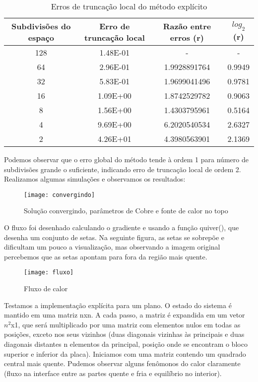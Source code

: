 \documentclass[12pt,fleqn]{article}
\begin{document}
\begin{table}[htb]
\begin{center}
		\begin{tabular}{|c|c|c|c|}\hline
			Subdivisões do espaço & Erro de truncação local & Razão entre erros (r) & $log_2$(r) \\\hline
			128 & 1.48E-01 & - & - \\\hline
			64 & 2.96E-01 & 1.9928891764 & 0.9949 \\\hline
			32 & 5.83E-01 & 1.9699041496 & 0.9781 \\\hline
			16 & 1.09E+00 & 1.8742529782 & 0.9063 \\\hline
			8 & 1.56E+00 & 1.4303795961 & 0.5164 \\\hline
			4 & 9.69E+00 & 6.2020540534	& 2.6327 \\\hline
			2 & 4.26E+01 & 4.3980563901	& 2.1369 \\\hline
		\end{tabular}
\caption{Erros de truncação local do método explícito}
\end{center}
\end{table}

Podemos observar que o erro global do método tende à ordem 1 para número de subdivisões grande o suficiente, indicando erro de truncação local de ordem 2. Realizamos algumas simulações e observamos os resultados:

\begin{figure}[H]
	\centering
		\texttt{[image: convergindo]}
		\caption{Solução convergindo, parâmetros de Cobre e fonte de calor no topo}
\end{figure}

O fluxo foi desenhado calculando o gradiente e usando a função quiver(), que desenha um conjunto de setas. Na seguinte figura, as setas se sobrepõe e dificultam um pouco a visualização, mas observando a imagem original percebemos que as setas apontam para fora da região mais quente.

\begin{figure}[H]
	\centering
		\texttt{[image: fluxo]}
		\caption{Fluxo de calor}
\end{figure}

Testamos a implementação explícita para um plano. O estado do sistema é mantido em uma matriz nxn. A cada passo, a matriz é expandida em um vetor $n^2$x1, que será multiplicado por uma matriz com elementos nulos em todas as posições, exceto nos seus vizinhos (duas diagonais vizinhas às principais e duas diagonais distantes n elementos da principal, posição onde se encontram o bloco superior e inferior da placa). Iniciamos com uma matriz contendo um quadrado central mais quente. Pudemos observar alguns fenômonos do calor claramente (fluxo na interface entre as partes quente e fria e equilíbrio no interior).
\end{document}

